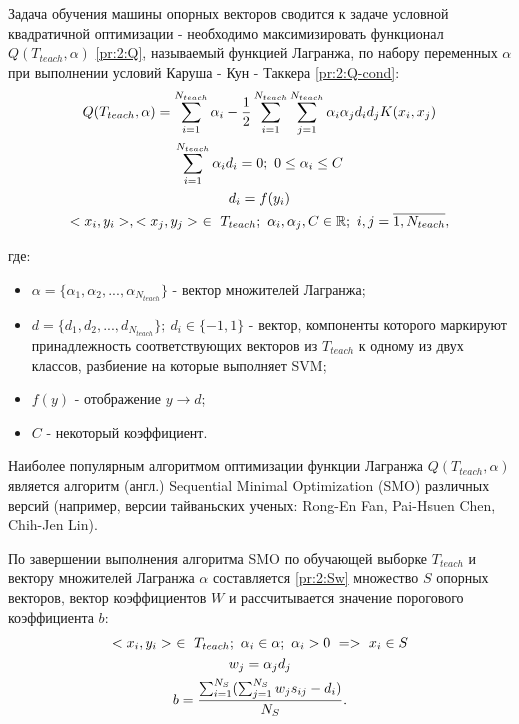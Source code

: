 Задача обучения машины опорных векторов сводится к задаче условной квадратичной оптимизации - необходимо максимизировать функционал \linebreak $Q(T_{teach}, \alpha)$ \eqref{pr:2:Q}, называемый функцией Лагранжа, по набору переменных $\alpha$ при выполнении условий Каруша - Кун - Таккера \eqref{pr:2:Q-cond}:
\begin{gather}
	\label{pr:2:Q}
	Q(T_{teach}, \alpha) = \sum_{i = 1}^{N_{teach}}\alpha_i -
			\dfrac{1}{2} \sum_{i = 1}^{N_{teach}} \sum_{j = 1}^{N_{teach}} \alpha_i \alpha_j d_i d_j K(x_i, x_j) \\
	\label{pr:2:Q-cond}
	\sum_{i = 1}^{N_{teach}} \alpha_i d_i = 0 ;~ 0 \le \alpha_i \le C \\
	d_i = f(y_i) \notag \\
	<x_i, y_i>, <x_j, y_j> ~ \in ~ T_{teach} ;~ \alpha_i, \alpha_j, C \in \mathbb{R} ;~ i, j = \overline{1, N_{teach}}, \notag
\end{gather}

где:
	
\begin{itemize}
			
	\item $\alpha = \{\alpha_1, \alpha_2, ..., \alpha_{N_{teach}}\}$ - вектор множителей Лагранжа;
	\item $d = \{d_1, d_2, ..., d_{N_{teach}}\} ;~ d_i \in \{-1, 1\}$ - вектор, компоненты которого маркируют принадлежность соответствующих векторов из $T_{teach}$ к одному из двух классов, разбиение на которые выполняет SVM;
	\item $f(y)$ - отображение $y \to d$;
	\item $C$ - некоторый коэффициент.

\end{itemize}

Наиболее популярным алгоритмом оптимизации функции Лагранжа $Q(T_{teach}, \alpha)$ является алгоритм (англ.) Sequential Minimal Optimization (SMO) различных версий (например, версии тайваньских ученых: Rong-En Fan, Pai-Hsuen Chen, Chih-Jen Lin).

По завершении выполнения алгоритма SMO по обучающей выборке $T_{teach}$ и вектору множителей Лагранжа $\alpha$ составляется \eqref{pr:2:Sw} множество $S$ опорных векторов, вектор коэффициентов $W$ и рассчитывается значение порогового коэффициента $b$:
\begin{gather}
	\label{pr:2:Sw}
	<x_i, y_i> ~\in~ T_{teach} ;~ \alpha_i \in \alpha ;~ \alpha_i > 0 ~ => ~ x_i \in S \\
	w_j = \alpha_j d_j \notag \\
	b = \dfrac{\sum_{i = 1}^{N_S}(\sum_{j = 1}^{N_S}w_j s_{ij} - d_i)}{N_S}. \notag
\end{gather}

